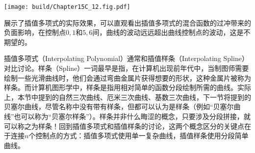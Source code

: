 \begin{Figure}[拉格朗日形式插值多项式的效果]
    \texttt{[image: build/Chapter15C\_12.fig.pdf]}
\end{Figure}

展示了插值多项式的实际效果，可以直观看出插值多项式的混合函数的过冲带来的负面影响，在控制点$0,1$和$5,6$间，曲线的波动远远超出曲线控制点的波动，这是不期望的。



插值多项式（Interpolating Polynomial）通常和插值样条（Interpolating Spline）对比讨论。样条（Spline）一词最早是指，在计算机出现前年代中，当制图师需要绘制一些光滑曲线时，他们会通过弯曲金属片获得想要的形状，这种金属片被称为样条。而计算机图形学中，样条是指用相对简单的函数分段绘制所需的曲线。实际上，本节中提到的自然三次曲线、厄米三次曲线、基数三次曲线，下一节将提到的贝塞尔曲线，尽管名称中没有带有样条，但都可以认为是样条（例如“贝塞尔曲线”也可以称为“贝塞尔样条”）。样条并非什么晦涩的概念，只要涉及分段拼接，就可以称之为样条！回到插值多项式和插值样条的讨论，这两个概念区分的关键点在于连接$n$个控制点的方式：插值多项式使用单一复杂曲线，插值样条使用分段简单曲线。
